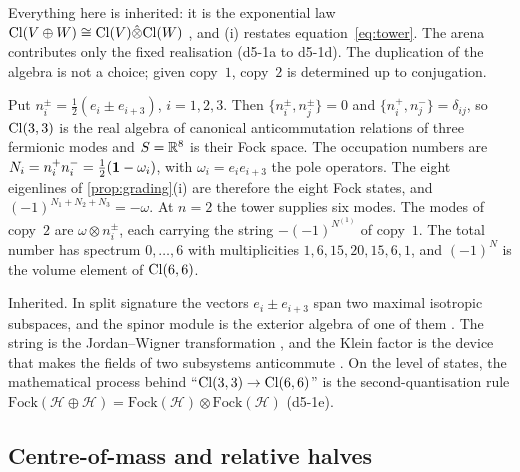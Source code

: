 Everything here is inherited: it is the exponential law $\mathrm{Cl}(V\oplus W)\cong\mathrm{Cl}(V)\hat\otimes\mathrm{Cl}(W)$ \cite{Chevalley54,LawsonMichelsohn89}, and
(i) restates equation~\cref{eq:tower}. The arena contributes only the fixed realisation (d5-1a to d5-1d). The duplication of the
algebra is not a choice; given copy~$1$, copy~$2$ is determined up to conjugation.

\begin{proposition}
\label{d5:prop:fock}
Put $n^\pm_i=\tfrac12(e_i\pm e_{i+3})$, $i=1,2,3$. Then $\{n^\pm_i,n^\pm_j\}=0$ and $\{n^+_i,n^-_j\}=\delta_{ij}$, so $\mathrm{Cl}(3,3)$ is the real
algebra of canonical anticommutation relations of three fermionic modes and $S=\mathbb{R}^8$ is their Fock space. The occupation numbers are
$N_i=n^+_in^-_i=\tfrac12(\mathbf 1-\omega_i)$, with $\omega_i=e_ie_{i+3}$ the pole operators. The eight eigenlines of \cref{prop:grading}(i) are therefore the eight Fock states, and $(-1)^{N_1+N_2+N_3}=-\omega$. At $n=2$ the tower supplies six modes. The modes of copy~$2$ are
$\omega\otimes n^\pm_i$, each carrying the string $-(-1)^{N^{(1)}}$ of copy~$1$. The total number has spectrum $0,\dots,6$ with multiplicities
$1,6,15,20,15,6,1$, and $(-1)^N$ is the volume element of $\mathrm{Cl}(6,6)$.
\end{proposition}

Inherited. In split signature the vectors $e_i\pm e_{i+3}$ span two maximal isotropic subspaces, and the spinor module is the exterior
algebra of one of them \cite{Chevalley54}. The string is the Jordan--Wigner transformation \cite{JordanWigner28}, and the Klein factor is the
device that makes the fields of two subsystems anticommute \cite{Klein38}. On the level of states, the mathematical process behind
``$\mathrm{Cl}(3,3)\to\mathrm{Cl}(6,6)$'' is the second-quantisation rule $\mathrm{Fock}(\mathcal H\oplus\mathcal H)=\mathrm{Fock}(\mathcal H)\otimes\mathrm{Fock}(\mathcal H)$
(d5-1e).

\subsection{Centre-of-mass and relative halves}
\label{d5:sec:cm}

